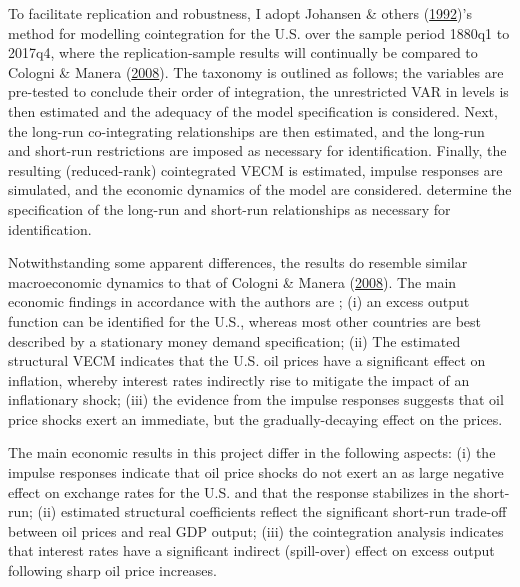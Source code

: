 \documentclass[11pt,preprint, authoryear]{elsarticle}
\numberwithin{equation}{section}
\numberwithin{figure}{section}
\numberwithin{table}{section}
\begin{document}
To facilitate replication and robustness, I adopt Johansen \& others
(\protect\hyperlink{ref-johansen1992}{1992})'s method for modelling
cointegration for the U.S. over the sample period 1880q1 to 2017q4,
where the replication-sample results will continually be compared to
Cologni \& Manera (\protect\hyperlink{ref-cologni2008}{2008}). The
taxonomy is outlined as follows; the variables are pre-tested to
conclude their order of integration, the unrestricted VAR in levels is
then estimated and the adequacy of the model specification is
considered. Next, the long-run co-integrating relationships are then
estimated, and the long-run and short-run restrictions are imposed as
necessary for identification. Finally, the resulting (reduced-rank)
cointegrated VECM is estimated, impulse responses are simulated, and the
economic dynamics of the model are considered. determine the
specification of the long-run and short-run relationships as necessary
for identification.

Notwithstanding some apparent differences, the results do resemble
similar macroeconomic dynamics to that of Cologni \& Manera
(\protect\hyperlink{ref-cologni2008}{2008}). The main economic findings
in accordance with the authors are ; (i) an excess output function can
be identified for the U.S., whereas most other countries are best
described by a stationary money demand specification; (ii) The estimated
structural VECM indicates that the U.S. oil prices have a significant
effect on inflation, whereby interest rates indirectly rise to mitigate
the impact of an inflationary shock; (iii) the evidence from the impulse
responses suggests that oil price shocks exert an immediate, but the
gradually-decaying effect on the prices.

The main economic results in this project differ in the following
aspects: (i) the impulse responses indicate that oil price shocks do not
exert an as large negative effect on exchange rates for the U.S. and
that the response stabilizes in the short-run; (ii) estimated structural
coefficients reflect the significant short-run trade-off between oil
prices and real GDP output; (iii) the cointegration analysis indicates
that interest rates have a significant indirect (spill-over) effect on
excess output following sharp oil price increases.
\end{document}
